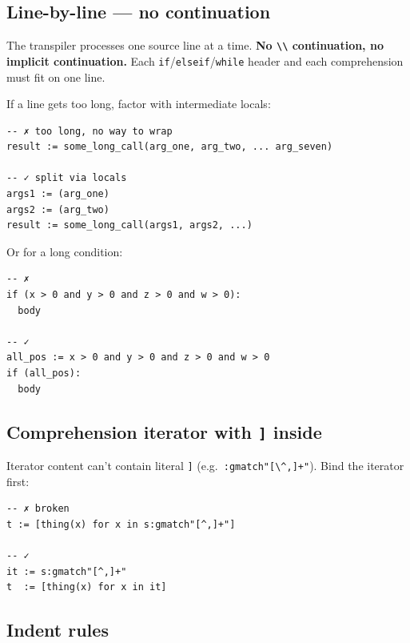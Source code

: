 \documentclass[10pt,twocolumn]{article}
\providecommand{\passthrough}[1]{#1}
\begin{document}
\subsection{Line-by-line --- no
continuation}\label{line-by-line-no-continuation}

The transpiler processes one source line at a time. \textbf{No
\passthrough{\lstinline!\\!} continuation, no implicit continuation.}
Each
\passthrough{\lstinline!if!}/\passthrough{\lstinline!elseif!}/\passthrough{\lstinline!while!}
header and each comprehension must fit on one line.

If a line gets too long, factor with intermediate locals:

\begin{lstlisting}[language=Fun]
-- ✗ too long, no way to wrap
result := some_long_call(arg_one, arg_two, ... arg_seven)

-- ✓ split via locals
args1 := (arg_one)
args2 := (arg_two)
result := some_long_call(args1, args2, ...)
\end{lstlisting}

Or for a long condition:

\begin{lstlisting}[language=Fun]
-- ✗
if (x > 0 and y > 0 and z > 0 and w > 0):
  body

-- ✓
all_pos := x > 0 and y > 0 and z > 0 and w > 0
if (all_pos):
  body
\end{lstlisting}

\subsection{\texorpdfstring{Comprehension iterator with \texttt{{]}}
inside}{Comprehension iterator with {]} inside}}\label{comprehension-iterator-with-inside}

Iterator content can't contain literal \passthrough{\lstinline!]!}
(e.g.~\passthrough{\lstinline!:gmatch"[\^,]+"!}). Bind the iterator
first:

\begin{lstlisting}[language=Fun]
-- ✗ broken
t := [thing(x) for x in s:gmatch"[^,]+"]

-- ✓
it := s:gmatch"[^,]+"
t  := [thing(x) for x in it]
\end{lstlisting}

\subsection{Indent rules}\label{indent-rules}
\end{document}
